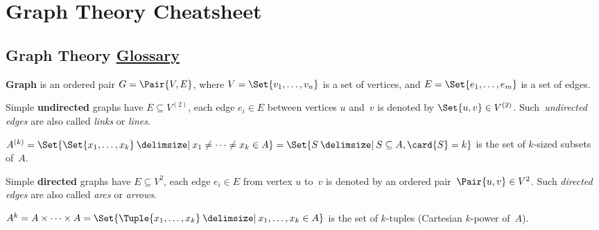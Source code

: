 \documentclass[a4paper,10pt]{article}
\begin{document}

\setcounter{section}{4}
\section{Graph Theory Cheatsheet}

\subsection{Graph Theory%
\texorpdfstring{\normalsize\protect{}\hfill\href{https://en.wikipedia.org/wiki/Glossary_of_graph_theory}{Glossary}}{}}

\begin{terms}
    \item \textbf{Graph} is an ordered pair $G = \Pair{V, E}$, where $V = \Set{v_1,\dotsc,v_n}$ is a set of vertices, and $E = \Set{e_1,\dotsc,e_m}$ is a set of edges.

    \item Simple \textbf{undirected} graphs have $E \subseteq V^{(2)}$, \ie each edge $e_i \in E$ between vertices $u$ and~$v$ is denoted by $\Set{u,v} \in V^{(2)}$.
    Such~\emph{undirected edges} are also called \emph{links} or \emph{lines}.

    \begin{terms}
        \item $A^{(k)} = \Set{\Set{x_1,\dotsc,x_k} \given x_1 \neq \dotsb \neq x_k \in A} = \Set{ S \given S \subseteq A, \card{S} = k }$ is the set of $k$-sized subsets of~$A$.
    \end{terms}

    \item Simple \textbf{directed} graphs have $E \subseteq V^{2}$, \ie each edge $e_i \in E$ from vertex $u$ to~$v$ is denoted by an ordered pair~$\Pair{u,v} \in V^{2}$.
    Such \emph{directed edges} are also called \emph{arcs} or \emph{arrows}.

    \begin{terms}
        \item $A^k = A \times \dotsb \times A = \Set{\Tuple{x_1,\dotsc,x_k} \given x_1,\dotsc,x_k \in A}$ is the set of $k$-tuples (Cartesian $k$-power of~$A$).
    \end{terms}

    \begin{minipage}{\linewidth}


\end{minipage}
\end{terms}
\end{document}
